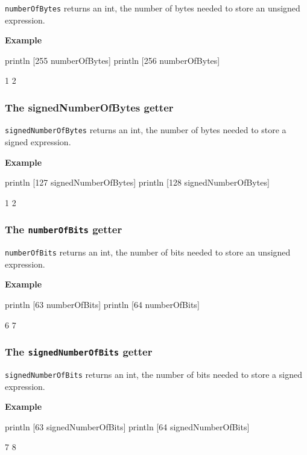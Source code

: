 \documentclass[10pt,openright,twosides]{report}
\newcommand{\gtlinline}[1]{\colorbox{light-blue}{\lstinline[language=gtl]{#1}}}
\newcommand{\example}{\vspace{.75em}\noindent\textbf{Example}\vspace{0em}}
\begin{document}
\gtlinline{numberOfBytes} returns an int, the number of bytes needed to store an unsigned expression.

\example
\begin{gtl}
println [255 numberOfBytes]
println [256 numberOfBytes]
\end{gtl}
\begin{console}
1
2
\end{console}

\subsubsection{The {\bfseries\ttfamily signedNumberOfBytes} getter}

\gtlinline{signedNumberOfBytes} returns an int, the number of bytes needed to store a signed expression. 

\example
\begin{gtl}
println [127 signedNumberOfBytes]
println [128 signedNumberOfBytes]
\end{gtl}
\begin{console}
1
2
\end{console}

\subsubsection{The \texttt{numberOfBits} getter}

\gtlinline{numberOfBits} returns an int, the number of bits needed to store an unsigned expression.

\example
\begin{gtl}
println [63 numberOfBits]
println [64 numberOfBits]
\end{gtl}
\begin{console}
6
7
\end{console}


\subsubsection{The \texttt{signedNumberOfBits} getter}

\gtlinline{signedNumberOfBits} returns an int, the number of bits needed to store a signed expression. 

\example
\begin{gtl}
println [63 signedNumberOfBits]
println [64 signedNumberOfBits]
\end{gtl}
\begin{console}
7
8
\end{console}
\end{document}
